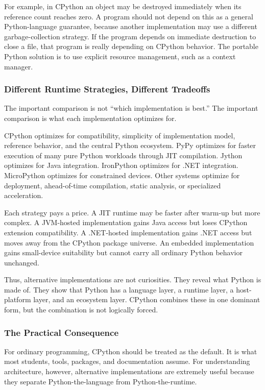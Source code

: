 For example, in CPython an object may be destroyed immediately when its reference count reaches zero. A program should not depend on this as a general Python-language guarantee, because another implementation may use a different garbage-collection strategy. If the program depends on immediate destruction to close a file, that program is really depending on CPython behavior. The portable Python solution is to use explicit resource management, such as a context manager.

\subsubsection{Different Runtime Strategies, Different Tradeoffs}

The important comparison is not ``which implementation is best.'' The important comparison is what each implementation optimizes for.

CPython optimizes for compatibility, simplicity of implementation model, reference behavior, and the central Python ecosystem. PyPy optimizes for faster execution of many pure Python workloads through JIT compilation. Jython optimizes for Java integration. IronPython optimizes for .NET integration. MicroPython optimizes for constrained devices. Other systems optimize for deployment, ahead-of-time compilation, static analysis, or specialized acceleration.

Each strategy pays a price. A JIT runtime may be faster after warm-up but more complex. A JVM-hosted implementation gains Java access but loses CPython extension compatibility. A .NET-hosted implementation gains .NET access but moves away from the CPython package universe. An embedded implementation gains small-device suitability but cannot carry all ordinary Python behavior unchanged.

Thus, alternative implementations are not curiosities. They reveal what Python is made of. They show that Python has a language layer, a runtime layer, a host-platform layer, and an ecosystem layer. CPython combines these in one dominant form, but the combination is not logically forced.

\subsubsection{The Practical Consequence}

For ordinary programming, CPython should be treated as the default. It is what most students, tools, packages, and documentation assume. For understanding architecture, however, alternative implementations are extremely useful because they separate Python-the-language from Python-the-runtime.

